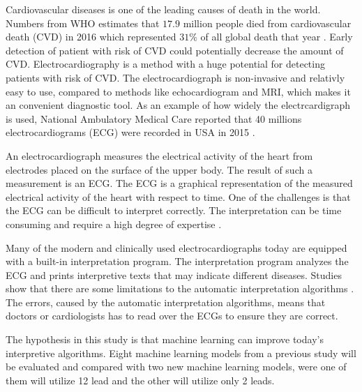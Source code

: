 Cardiovascular diseases is one of the leading causes of death in the world. Numbers from WHO estimates that $17.9$ million people died from cardiovascular death (CVD) in 2016 which represented $31\%$ of all global death that year \cite{noauthor_cardiovascular_nodate}. Early detection of patient with risk of CVD could potentially decrease the amount of CVD. Electrocardiography is a method with a huge potential for detecting patients with risk of CVD. The electrocardiograph is non-invasive and relativly easy to use, compared to methods like echocardiogram and MRI, which makes it an convenient diagnostic tool. As an example of how widely the electrcardigraph is used, National Ambulatory Medical Care reported that 40 millions electrocardiograms (ECG) were recorded in USA in 2015 \cite{us_department_of_health_and_human_services_national_2015}.

An electrocardiograph measures the electrical activity of the heart from electrodes placed on the surface of the upper body. The result of such a measurement is an ECG. The ECG is a graphical representation of the measured electrical activity of the heart with respect to time. One of the challenges is that the ECG can be difficult to interpret correctly. The interpretation can be time consuming and require a high degree of expertise \cite{bickerton_misplaced_2019}.

Many of the modern and clinically used electrocardiographs today are equipped with a built-in interpretation program. The interpretation program analyzes the ECG and prints interpretive texts that may indicate different diseases. Studies show that there are some limitations to the automatic interpretation algorithms \cite{schlapfer_computer-interpreted_2017, smulyan_computerized_2019}. The errors, caused by the automatic interpretation algorithms, means that doctors or cardiologists has to read over the ECGs to ensure they are correct.

The hypothesis in this study is that machine learning can improve today's interpretive algorithms. Eight machine learning models from a previous study \cite{singstad_convolutional_nodate} will be evaluated and compared with two new machine learning models, were one of them will utilize 12 lead and the other will utilize only 2 leads. 

